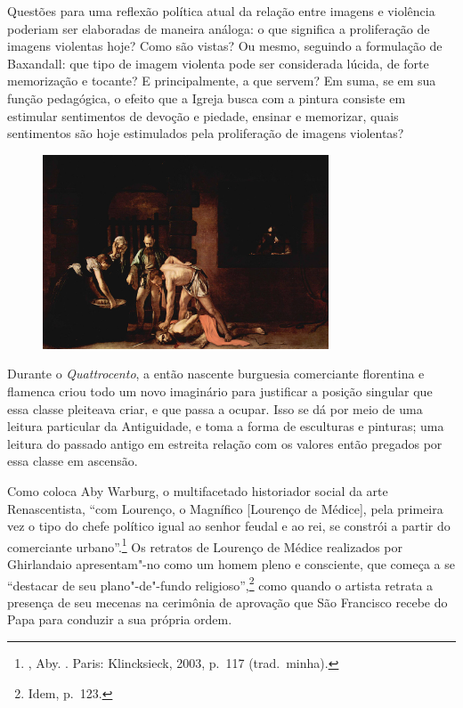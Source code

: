 Questões para uma reflexão política atual da relação entre imagens e
violência poderiam ser elaboradas de maneira análoga: o que significa a
proliferação de imagens violentas hoje? Como são vistas? Ou mesmo,
seguindo a formulação de Baxandall: que tipo de imagem violenta pode ser
considerada lúcida, de forte memorização e tocante? E principalmente, a
que servem? Em suma, se em sua função pedagógica, o efeito que a Igreja
busca com a pintura consiste em estimular sentimentos de devoção e
piedade, ensinar e memorizar, quais sentimentos são hoje estimulados
pela proliferação de imagens violentas?


\begin{figure}[!ht]
\centering
 \includegraphics[width=85mm]{./imgs/decapitacao.png}
\caption{\tiny{}}
\end{figure}

\asterisc

Durante o \emph{Quattrocento}, a então nascente burguesia comerciante
florentina e flamenca criou todo um novo imaginário para justificar a
posição singular que essa classe pleiteava criar, e que passa a ocupar.
Isso se dá por meio de uma leitura particular da Antiguidade, e toma a
forma de esculturas e pinturas; uma leitura do passado antigo em
estreita relação com os valores então pregados por essa classe em
ascensão.

Como coloca Aby Warburg, o multifacetado historiador social da arte
Renascentista, ``com Lourenço, o Magnífico {[}Lourenço de
Médice{]}, pela primeira vez o tipo do chefe político igual ao senhor
feudal e ao rei, se constrói a partir do comerciante urbano''.\footnote{, Aby. {}. Paris: Klincksieck, 2003, p.~117 (trad.~minha).}
Os retratos de Lourenço de Médice realizados por Ghirlandaio
apresentam"-no como um homem pleno e consciente, que começa a se
``destacar de seu plano"-de"-fundo religioso'',\footnote{Idem, p.~123.}
como quando o artista retrata a presença de seu mecenas na cerimônia de
aprovação que São Francisco recebe do Papa para conduzir a sua própria
ordem.

